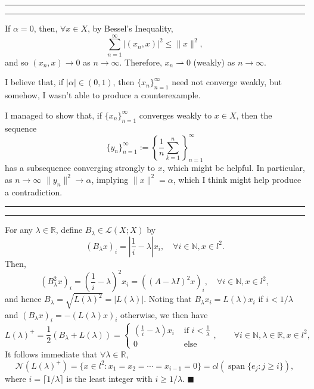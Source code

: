 \documentclass[11pt]{article}
\newcounter{questionCounter}
\newcounter{partCounter}[questionCounter]
\newenvironment{question}[2][\arabic{questionCounter}]{%
    \setcounter{partCounter}{0}%
    \vspace{.25in} \hrule \vspace{0.5em}%
        \noindent{\bf #2}%
    \vspace{0.8em} \hrule \vspace{.10in}%
    \addtocounter{questionCounter}{1}%
}{}
\renewcommand{\qed}{\quad \ensuremath{\blacksquare}}
\renewcommand{\sp}{\operatorname{span}} %
\newcommand{\N}{\mathbb{N}}             %
\newcommand{\R}{\mathbb{R}}             %
\newcommand{\Nul}{\mathcal{N}}          %
\renewcommand{\L}{\mathcal{L}}          %
\newcommand{\wto}{\rightharpoonup}      %
\begin{document}
\begin{question}{Problem 4}
If $\alpha = 0$, then, $\forall x \in X$, by Bessel's Inequality,
\[\sum_{n = 1}^\infty |(x_n,x)|^2 \leq \|x\|^2,\]
and so $(x_n,x) \to 0$ as $n \to \infty$. Therefore, $x_n \wto 0$ (weakly) as
$n \to \infty$.

I believe that, if $|\alpha| \in (0,1)$, then $\{x_n\}_{n = 1}^\infty$ need not
converge weakly, but somehow, I wasn't able to produce a counterexample.

I managed to show that, if $\{x_n\}_{n = 1}^\infty$ converges weakly to
$x \in X$, then the sequence
\[\{y_n\}_{n = 1}^\infty
    := \left\{\frac{1}{n} \sum_{k = 1}^n\right\}_{n = 1}^\infty\]
has a subsequence converging strongly to $x$, which might be helpful. In
particular, as $n \to \infty$ $\|y_n\|^2 \to \alpha$, implying
$\|x\|^2 = \alpha$, which I think might help produce a contradiction.
\end{question}

\begin{question}{Problem 6}
For any $\lambda \in \R$, define $B_\lambda \in \L(X;X)$ by
\[(B_\lambda x)_i = \left| \frac{1}{i} - \lambda \right| x_i,
    \quad \forall i \in \N, x \in l^2.\]
Then,
\[(B_\lambda^2 x)_i = \left( \frac{1}{i} - \lambda \right)^2 x_i
    = \left( (A - \lambda I)^2 x \right)_i,
    \quad \forall i \in \N, x \in l^2,\]
and hence $B_\lambda = \sqrt{L(\lambda)^2} = |L(\lambda)|$. Noting that
$B_\lambda x_i = L(\lambda) x_i$ if $i < 1/\lambda$ and
$(B_\lambda x)_i = - (L(\lambda) x)_i$ otherwise, we then have
\[L(\lambda)^+
    = \frac{1}{2} (B_\lambda + L(\lambda))
    = \left\{
        \begin{array}{ll}
            \left( \frac{1}{i} - \lambda \right) x_i & \mbox{ if } i < \frac{1}{\lambda}  \\
            0 & \mbox{ else}
        \end{array}
    \right., \quad \quad \forall i \in \N, \lambda \in \R, x \in l^2,
\]
It follows immediate that $\forall \lambda \in \R$,
\[\Nul(L(\lambda)^+)
    = \{x \in l^2 : x_1 = x_2 = \cdots = x_{i - 1} = 0\}
    = cl(\sp\{e_j : j \geq i\}),
\]
where $i = \lceil1/\lambda\rceil$ is the least integer with $i \geq 1/\lambda$.
\qed
\end{question}
\end{document}
